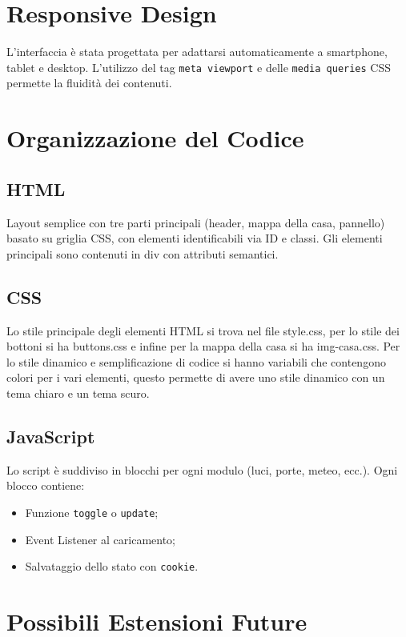 \documentclass[a4paper,12pt]{article}
\begin{document}
\section{Responsive Design}

L’interfaccia è stata progettata per adattarsi automaticamente a smartphone, tablet e desktop. L’utilizzo del tag \texttt{meta viewport} e delle \texttt{media queries} CSS permette la fluidità dei contenuti.

\section{Organizzazione del Codice}

\subsection*{HTML}

Layout semplice con tre parti principali (header, mappa della casa, pannello) basato su griglia CSS, con elementi identificabili via ID e classi. Gli elementi principali sono contenuti in div con attributi semantici.

\subsection*{CSS}

Lo stile principale degli elementi HTML si trova nel file style.css, per lo stile dei bottoni si ha buttons.css e infine per la mappa della casa si ha img-casa.css. Per lo stile dinamico e semplificazione di codice si hanno variabili che contengono colori per i vari elementi, questo permette di avere uno stile dinamico con un tema chiaro e un tema scuro.

\subsection*{JavaScript}

Lo script è suddiviso in blocchi per ogni modulo (luci, porte, meteo, ecc.). Ogni blocco contiene:

\begin{itemize}
  \item Funzione \texttt{toggle} o \texttt{update};
  \item Event Listener al caricamento;
  \item Salvataggio dello stato con \texttt{cookie}.
\end{itemize}

\section{Possibili Estensioni Future}
\end{document}
